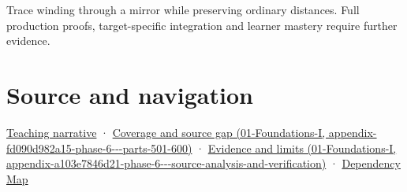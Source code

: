 Trace winding through a mirror while preserving ordinary distances. Full production proofs, target-specific integration and learner mastery require further evidence.

\section{Source and navigation}\label{appendix-87d7626c8d37-source-and-navigation}

\href{Continuous\%20Notes/Computing\%20Foundations\%20-\%20From\%20Bits\%20to\%20C++\%20and\%20Systems\%20APIs\#Oriented\%20area\%20tells\%20us\%20which\%20side\%20of\%20the\%20panel\%20is\%20front}{Teaching narrative} · \href{../01-Foundations-I/main.pdf\#nameddest=appendix-fd090d982a15-phase-6---parts-501-600}{Coverage and source gap (01-Foundations-I, appendix-fd090d982a15-phase-6-\/-\/-parts-501-600)} · \href{../01-Foundations-I/main.pdf\#nameddest=appendix-a103e7846d21-phase-6---source-analysis-and-verification}{Evidence and limits (01-Foundations-I, appendix-a103e7846d21-phase-6-\/-\/-source-analysis-and-verification)} · \hyperref[appendix-4ad47bdd269a]{Dependency Map}
